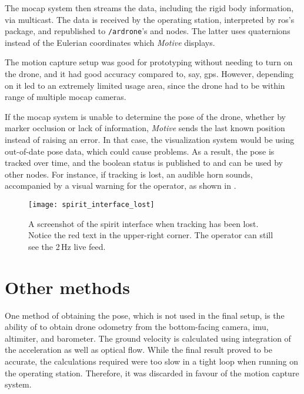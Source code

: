 
    The \gls{mocap} system then streams the data, including the rigid body information, via multicast.
    The data is received by the operating station, interpreted by \gls{ros}'s \textsf{} package, and republished to \texttt{/ardrone}'s \texttt{} and \texttt{} nodes.
    The latter uses quaternions instead of the Eulerian coordinates which \emph{Motive} displays.

    The motion capture setup was good for prototyping without needing to turn on the drone, and it had good accuracy compared to, say, \gls{gps}.
    However, depending on it led to an extremely limited usage area, since the drone had to be within range of multiple \gls{mocap} cameras.

    If the \gls{mocap} system is unable to determine the pose of the drone, whether by marker occlusion or lack of information, \emph{Motive} sends the last known position instead of raising an error.
    In that case, the visualization system would be using out-of-date pose data, which could cause problems.
    As a result, the pose is tracked over time, and the boolean status is published to \texttt{} and can be used by other nodes.
    For instance, if tracking is lost, an audible horn sounds, accompanied by a visual warning for the operator, as shown in .

    \begin{figure}[h]
      \centering
      \texttt{[image: spirit\_interface\_lost]}
      \caption[Interface with tracking lost]{A screenshot of the \gls{spirit} interface when tracking has been lost. Notice the red text in the upper-right corner. The operator can still see the 2\,Hz live feed.}
      \label{fig:spirit_interface_lost}
    \end{figure}

  \section{Other methods}
    One method of obtaining the pose, which is not used in the final setup, is the ability of \textsf{} to obtain drone odometry from the bottom-facing camera, \gls{imu}, altimiter, and barometer.
    The ground velocity is calculated using integration of the acceleration as well as optical flow.
    While the final result proved to be accurate, the calculations required were too slow in a tight loop when running on the operating station.
    Therefore, it was discarded in favour of the motion capture system.

